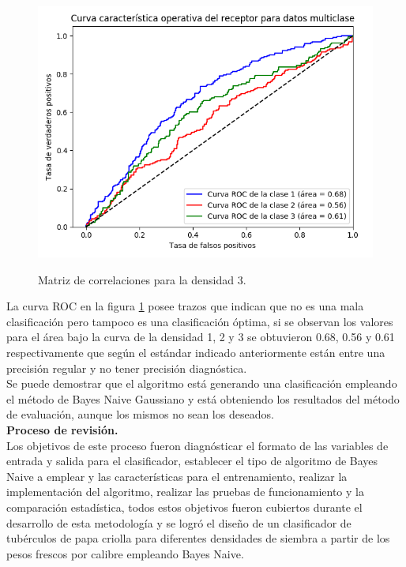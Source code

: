 \begin{figure}[h!]
	\caption{Matriz de correlaciones para la densidad 3.}
	\centering
	\includegraphics[scale=0.55]{roc.png}
	\label{fig:roc}
\end{figure}

La curva ROC en la figura \ref{fig:roc} posee trazos que indican que no es una mala clasificación pero tampoco es una clasificación
óptima, si se observan los valores para el área bajo la curva de la densidad 1, 2 y 3
se obtuvieron 0.68, 0.56 y 0.61 respectivamente que según el estándar indicado anteriormente
están entre una precisión regular y no tener precisión diagnóstica.\\

Se puede demostrar que el algoritmo está generando una clasificación empleando el método de Bayes Naive Gaussiano
y está obteniendo los resultados del método de evaluación, aunque los mismos no sean los deseados.\\

\noindent
\textbf{Proceso de revisión.}\\

Los objetivos de este proceso fueron diagnósticar el formato de las
variables de entrada y salida para el clasificador, establecer el tipo de
algoritmo de Bayes Naive a emplear y las características para el entrenamiento,
realizar la implementación del algoritmo, realizar las pruebas de funcionamiento
y la comparación estadística, todos estos objetivos fueron cubiertos durante el
desarrollo de esta metodología y se logró el diseño de un clasificador de tubérculos
de papa criolla para diferentes densidades de siembra a partir de los pesos frescos
por calibre empleando Bayes Naive.\\


